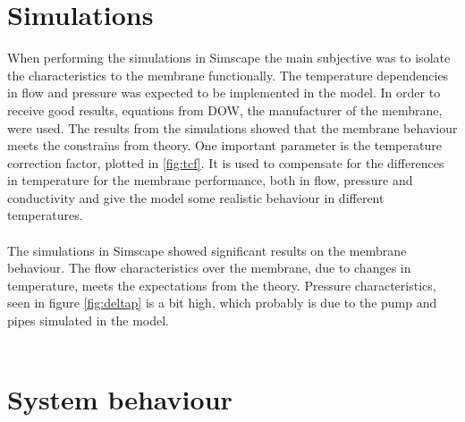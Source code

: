 \section{Simulations}
When performing the simulations in Simscape the main subjective was to isolate the characteristics to the membrane functionally. The temperature dependencies in flow and pressure was expected to be implemented in the model. In order to receive good results, equations from DOW, the manufacturer of the membrane, were used. The results from the simulations showed that the membrane behaviour meets the constrains from theory. One important parameter is the temperature correction factor, plotted in \ref{fig:tcf}. It is used to compensate for the differences in temperature for the membrane performance, both in flow, pressure and conductivity and give the model some realistic behaviour in different temperatures. \\
\\
The simulations in Simscape showed significant results on the membrane behaviour. The flow characteristics over the membrane, due to changes in temperature, meets the expectations from the theory. Pressure characteristics, seen in figure \ref{fig:deltap} is a bit high, which probably is due to the pump and pipes simulated in the model. \\
\\


\section{System behaviour} 


